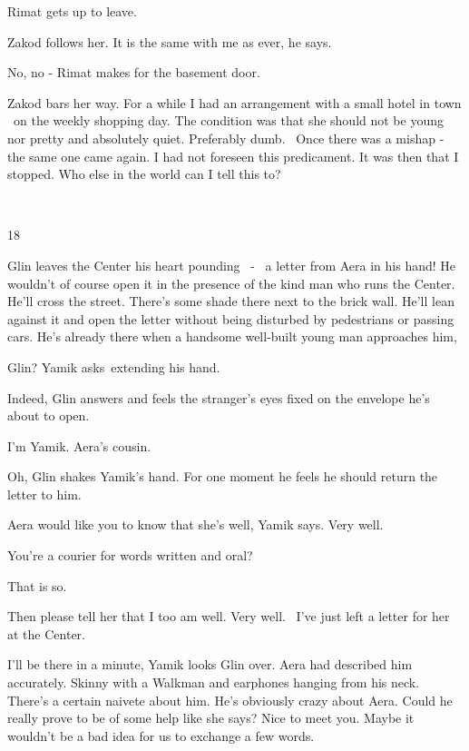 \documentclass[letterpaper]{article}
\begin{document}
Rimat gets up to leave.

Zakod follows her. {\textquotedbl}It is the same with me as ever,{\textquotedbl} he says. 

{\textquotedbl}No, no -{\textquotedbl} Rimat makes for the basement door. 

Zakod bars her way. {\textquotedbl}For a while I had an arrangement with a small hotel in town \ on the weekly shopping
day. The condition was that she should not be young nor pretty and absolutely quiet. Preferably dumb. ~Once there was a
mishap - the same one came again. I had not foreseen this predicament. It was then that I stopped. Who else in the
world can I tell this to?{\textquotedbl} 

~

18 

Glin leaves the Center his heart pounding \ {}- \ a letter from Aera in his hand! He wouldn't of course open it in the
presence of the kind man who runs the Center. He'll cross the street. There's some shade there next to the brick wall.
He'll lean against it and open the letter without being disturbed by pedestrians or passing cars. He's already there
when a handsome well-built young man approaches him,~

{\textquotedbl}Glin?{\textquotedbl} Yamik asks~extending his hand. 

{\textquotedbl}Indeed,{\textquotedbl} Glin answers and feels the stranger's eyes fixed on the envelope he's about to
open. 

{\textquotedbl}I'm Yamik. Aera's cousin.{\textquotedbl} 

{\textquotedbl}Oh,{\textquotedbl} Glin shakes Yamik's hand. For one moment he feels he should return the letter to him.
~

{\textquotedbl}Aera would like you to know that she's well,{\textquotedbl} Yamik says. {\textquotedbl}Very
well.{\textquotedbl} 

{\textquotedbl}You're a courier for words written and oral?{\textquotedbl} 

{\textquotedbl}That is so.{\textquotedbl} 

{\textquotedbl}Then please tell her that I too am well. Very well.~ I've just left a letter for her at the
Center.{\textquotedbl} 

{\textquotedbl}I'll be there in a minute,{\textquotedbl} Yamik looks Glin over. Aera had described him accurately.
Skinny with a Walkman and earphones hanging from his neck. There's a certain naivete about him. He's obviously crazy
about Aera. Could he really prove to be of some help like she says? {\textquotedbl}Nice to meet you. Maybe it wouldn't
be a bad idea for us to exchange a few words.{\textquotedbl} 
\end{document}
